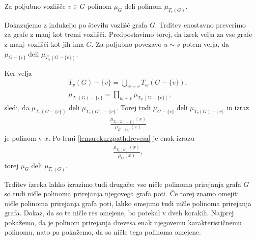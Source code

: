 \begin{izrek}
    Za poljubno vozlišče \(v\in G\) polinom \(\mu_G\) deli polinom \(\mu_{T_v(G)}\).
\end{izrek}
\begin{dokaz}
    Dokazujemo z indukcijo po številu vozlišč grafa \(G\). Trditev enostavno preverimo za grafe z manj kot tremi vozlišči. Predpostavimo torej, da izrek velja za vse grafe z manj vozlišči kot jih ima \(G\). Za poljubno povezavo \(u\sim v\) potem velja, da \(\mu_{G-\{v\}}\) deli \(\mu_{T_u(G-\{v\})}\).

    Ker velja
    \begin{align*}
        T_v(G) - \{v\} = \bigcup_{w\sim v} T_w(G-\{v\}), \\
        \mu_{T_v(G) - \{v\}} = \prod_{w\sim v} \mu_{T_w(G-\{v\})},
    \end{align*}
    sledi, da \(\mu_{T_u(G-\{v\})}\) deli \(\mu_{T_v(G) - \{v\}}\). Torej tudi \(\mu_{G-\{v\}}\) deli \(\mu_{T_v(G) - \{v\}}\) in izraz
    \begin{align*}
        \frac{\mu_{T_v(G) - \{v\}}(x)}{\mu_{G-\{v\}}(x)}
    \end{align*}
    je polinom v \(x\). Po lemi \ref{lemarekurzpathdrevesa} je enak izrazu
    \begin{align*}
        \frac{\mu_{T_v(G)}(x)}{\mu_{G}(x)},
    \end{align*}
    torej \(\mu_G\) deli \(\mu_{T_v(G)}\).
\end{dokaz}

Trditev izreka lahko izrazimo tudi drugače: vse ničle polinoma prirejanja grafa \(G\) so tudi ničle polinoma prirejanja njegovega grafa poti. Če torej znamo omejiti ničle polinoma prirejanja grafa poti, lahko omejimo tudi ničle polinoma prirejanja grafa. Dokaz, da so te ničle res omejene, bo potekal v dveh korakih. Najprej pokažemo, da je polinom prirejanja drevesa enak njegovemu karakterističnemu polinomu, nato pa pokažemo, da so ničle tega polinoma omejene.

